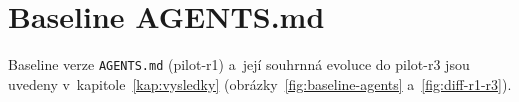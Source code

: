 \chapter{Baseline AGENTS.md}
\label{app:baseline-agents-md}

Baseline verze \texttt{AGENTS.md} (pilot-r1) a~její souhrnná evoluce
do pilot-r3 jsou uvedeny v~kapitole~\ref{kap:vysledky}
(obrázky~\ref{fig:baseline-agents} a~\ref{fig:diff-r1-r3}).
